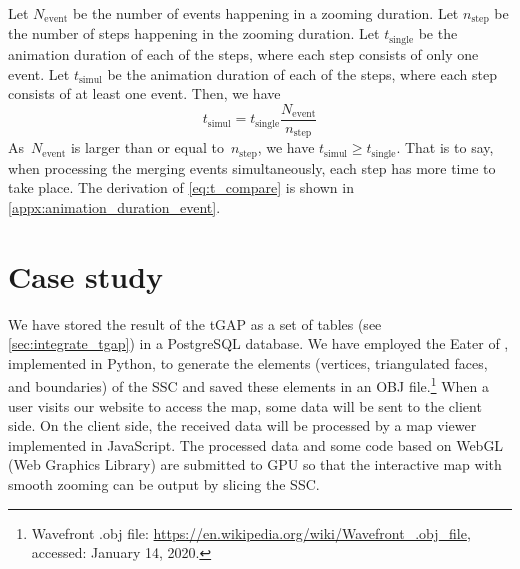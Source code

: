 \documentclass[twocolumn]{svjour3}          %
\begin{document}
Let $N_\mathrm{event}$ be the number of events happening in a zooming duration.
Let $n_\mathrm{step}$ be the number of steps happening in the zooming duration.
Let $t_\mathrm{single}$ be the animation duration of each of the steps,
where each step consists of only one event.
Let $t_\mathrm{simul}$ be the animation duration of each of the steps,
where each step consists of at least one event.
Then, we have 
\begin{equation}
\label{eq:t_compare}
t_\mathrm{simul} = t_\mathrm{single}  \frac{N_\mathrm{event}}{n_\mathrm{step}}
\end{equation}
As~$N_\mathrm{event}$ is larger than or equal to~$n_\mathrm{step}$,
we have $t_\mathrm{simul} \ge t_\mathrm{single}$.
That is to say, when processing the merging events simultaneously,
each step has more time to take place. 
The derivation of \eq\ref{eq:t_compare} is shown 
in \appx\ref{appx:animation_duration_event}.







\section{Case study}
\label{sec:case_study}




We have stored the result of the tGAP 
as a set of tables (see \sect\ref{sec:integrate_tgap}) 
in a PostgreSQL database.
We have employed the Eater of \citet{Suba2014Merge},
implemented in Python, 
to generate the elements
(vertices, triangulated faces, and boundaries)
of the SSC \citep{vanOosterom2014tGAPSSC} 
and saved these elements in an OBJ file.\footnote{%
Wavefront .obj file:
\url{https://en.wikipedia.org/wiki/Wavefront_.obj_file},
accessed: January 14, 2020.}
%
When a user visits our website to access the map,
some data will be sent to the client side.  
On the client side,
the received data will be processed
by a map viewer implemented in JavaScript.
The processed data and some code based on WebGL (Web Graphics Library)
are submitted to GPU so that 
the interactive map with smooth zooming
can be output by slicing the SSC.
\end{document}

